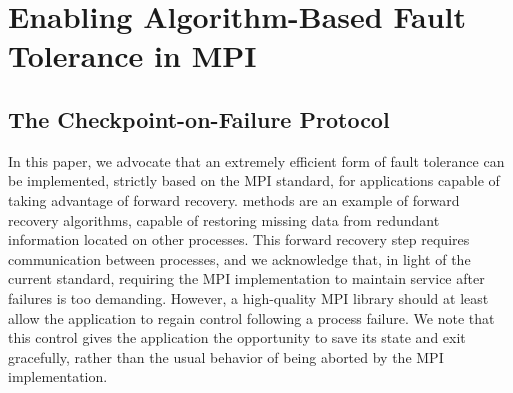 \section{Enabling Algorithm-Based Fault Tolerance in MPI}
\label{sect:ompi}

\subsection{The Checkpoint-on-Failure Protocol}

In this paper, we advocate that an extremely efficient form of fault tolerance
can be implemented, strictly based on the MPI standard, for applications capable
of taking advantage of forward recovery. \abft methods are an example of forward
recovery algorithms, capable of restoring missing data from redundant information
located on other processes.  This forward recovery step requires communication
between processes, and we acknowledge that, in light of the current standard,
requiring the MPI implementation to maintain service after failures is too
demanding. However, a high-quality MPI library should at least allow the application to regain control following a process failure. We note
that this control gives the application the opportunity to save its state and
exit gracefully, rather than the usual behavior of being aborted by the MPI
implementation.

